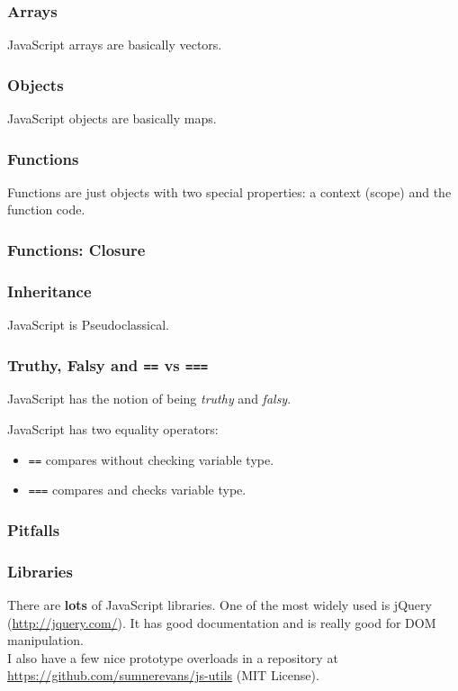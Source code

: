\documentclass{lug}
\begin{document}
\begin{frame}
    \frametitle{Arrays}

    JavaScript arrays are basically vectors.
\end{frame}

\begin{frame}
    \frametitle{Objects}

    JavaScript objects are basically maps.
\end{frame}

\begin{frame}
    \frametitle{Functions}

    Functions are just objects with two special properties: a context (scope) and the function code.
\end{frame}

\begin{frame}
    \frametitle{Functions: Closure}

\end{frame}

\begin{frame}
    \frametitle{Inheritance}
    JavaScript is Pseudoclassical.

\end{frame}

\begin{frame}
    \frametitle{Truthy, Falsy and \texttt{==} vs \texttt{===}}

    JavaScript has the notion of being \textit{truthy} and \textit{falsy}.

    JavaScript has two equality operators:
    \begin{itemize}
        \item \texttt{==} compares without checking variable type.
        \item \texttt{===} compares and checks variable type.
    \end{itemize}
\end{frame}

\begin{frame}
    \frametitle{Pitfalls}

\end{frame}

\begin{frame}
    \frametitle{Libraries}

    There are \textbf{lots} of JavaScript libraries. One of the most widely used is jQuery
    (\url{http://jquery.com/}). It has good documentation and is really good for DOM
    manipulation.\\

    I also have a few nice prototype overloads in a repository at
    \url{https://github.com/sumnerevans/js-utils} (MIT License).

\end{frame}
\end{document}

